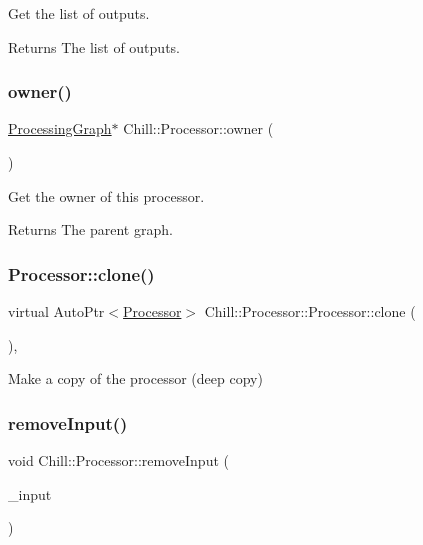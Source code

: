 Get the list of outputs. \begin{DoxyReturn}{Returns}
The list of outputs. 
\end{DoxyReturn}
\mbox{\label{class_chill_1_1_processor_a3024af1d7f7785b03485a79eece5be3b}} 
\subsubsection{\texorpdfstring{owner()}{owner()}}
{\footnotesize\ttfamily \mbox{\hyperlink{class_chill_1_1_processing_graph}{Processing\+Graph}}$\ast$ Chill\+::\+Processor\+::owner (\begin{DoxyParamCaption}{ }\end{DoxyParamCaption})\hspace{0.3cm}{\ttfamily [inline]}}

Get the owner of this processor. \begin{DoxyReturn}{Returns}
The parent graph. 
\end{DoxyReturn}
\mbox{\label{class_chill_1_1_processor_ad3cc90a592d8755afb546e9b701489e4}} 
\subsubsection{\texorpdfstring{Processor\+::clone()}{Processor::clone()}}
{\footnotesize\ttfamily virtual Auto\+Ptr$<$\mbox{\hyperlink{class_chill_1_1_processor}{Processor}}$>$ Chill\+::\+Processor\+::\+Processor\+::clone (\begin{DoxyParamCaption}{ }\end{DoxyParamCaption})\hspace{0.3cm}{\ttfamily [inline]}, {\ttfamily [virtual]}}

Make a copy of the processor (deep copy) \mbox{\label{class_chill_1_1_processor_afff216d6d38739af754c4d6e62702214}} 
\subsubsection{\texorpdfstring{remove\+Input()}{removeInput()}}
{\footnotesize\ttfamily void Chill\+::\+Processor\+::remove\+Input (\begin{DoxyParamCaption}\item[{Auto\+Ptr$<$ \mbox{\hyperlink{class_chill_1_1_processor_input}{Processor\+Input}} $>$ \&}]{\+\_\+input }\end{DoxyParamCaption})}

